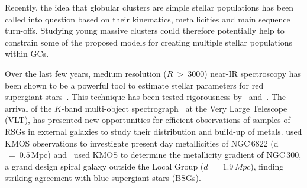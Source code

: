 \documentclass[useAMS,usenatbib]{mn2e}
\begin{document}
Recently, the idea that globular clusters are simple stellar populations has been called into question based on their kinematics, metallicities and main sequence turn-offs.
Studying young massive clusters could therefore potentially help to constrain some of the proposed models for creating multiple stellar populations within GCs.



Over the last few years, medium resolution ($R~>~3000$) near-IR spectroscopy has been shown to be a powerful tool to estimate stellar parameters for red supergiant stars~\citep[RSGs;][]{2010MNRAS.407.1203D}.
This technique has been tested rigorousness by~\cite{2014ApJ...788...58G} and~\cite{2015ApJ...806...21D}.
The arrival of the $K$-band multi-object spectrograph~\citep[KMOS;][]{2013Msngr.151...21S} at the Very Large Telescope (VLT), has presented new opportunities for efficient observations of samples of RSGs in external galaxies to study their distribution and build-up of metals.
\cite{2015ApJ...803...14P} used KMOS observations to investigate present day metallicities of NGC\,6822 (d$~=~0.5\,$Mpc) and~\cite{2015ApJ...805..182G} used KMOS to determine the metallicity gradient of NGC\,300, a grand design spiral galaxy outside the Local Group ($d~=~1.9\,Mpc$), finding striking agreement with blue supergiant stars (BSGs).



\end{document}

